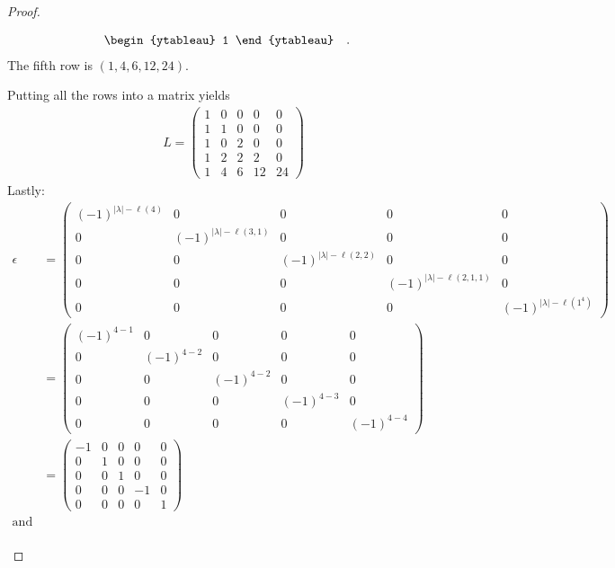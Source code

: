 \documentclass[12pt]{extarticle}
\newcommand{\abs}[1]{|#1|}
\newcommand{\<}{\langle}
\renewcommand{\>}{\rangle}
\theoremstyle{definition}
\begin{document}
\begin{proof}
\begin{enumerate}
\begin{itemize}
\begin{align*}
\begin{ytableau}
          1
        \end{ytableau}\quad.\quad
      \end{align*}
      The fifth row is $(1,4,6,12,24)$.
    \end{itemize}
    Putting all the rows into a matrix yields
    \begin{align*}
      L = 
      \begin{pmatrix}
        1 & 0 & 0 & 0 & 0 \\
        1 & 1 & 0 & 0 & 0 \\
        1 & 0 & 2 & 0 & 0 \\
        1 & 2 & 2 & 2 & 0 \\
        1 & 4 & 6 & 12 & 24
      \end{pmatrix}
    \end{align*}
    Lastly:
    \begin{align*}
      \epsilon
      &= 
      \begin{pmatrix}
        (-1)^{\abs{\lambda}- \ell(4)} & 0 & 0 & 0 & 0 \\
        0 & (-1)^{\abs{\lambda}-\ell(3,1)} & 0 & 0 & 0 \\
        0 & 0 & (-1)^{\abs{\lambda}-\ell(2,2)} & 0 & 0 \\
        0 & 0 & 0 & (-1)^{\abs{\lambda}-\ell(2,1,1)} & 0 \\
        0 & 0 & 0 & 0 & (-1)^{\abs{\lambda}-\ell(1^4)} 
      \end{pmatrix} \\
      &=
      \begin{pmatrix}
        (-1)^{4- 1} & 0 & 0 & 0 & 0 \\
        0 & (-1)^{4-2} & 0 & 0 & 0 \\
        0 & 0 & (-1)^{4-2} & 0 & 0 \\
        0 & 0 & 0 & (-1)^{4-3} & 0 \\
        0 & 0 & 0 & 0 & (-1)^{4-4} 
      \end{pmatrix} \\
      &=
      \begin{pmatrix}
        -1 & 0 & 0 & 0 & 0 \\
        0 & 1 & 0 & 0 & 0 \\
        0 & 0 & 1 & 0 & 0 \\
        0 & 0 & 0 & -1 & 0 \\
        0 & 0 & 0 & 0 & 1
      \end{pmatrix} \\
      \text{and}
      \\

\end{align*}
\end{enumerate}
\end{proof}
\end{document}
